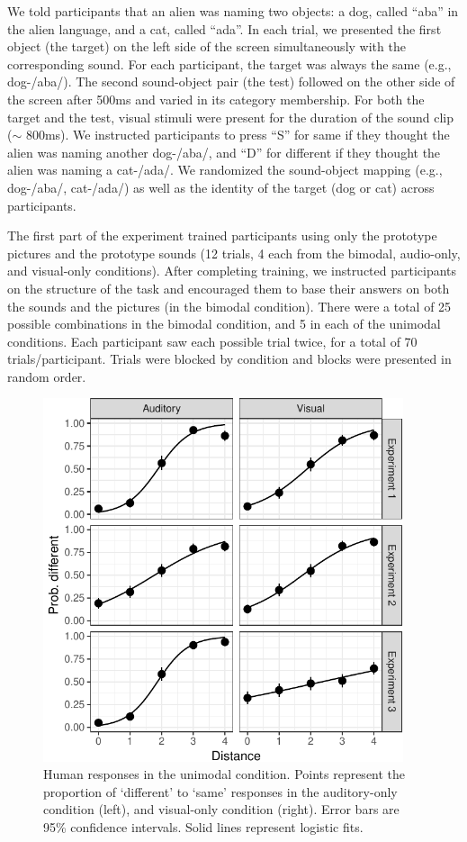 \documentclass[english,man]{apa6}
\theoremstyle{definition}
\theoremstyle{definition}
\theoremstyle{definition}
\theoremstyle{remark}
\begin{document}
We told participants that an alien was naming two objects: a dog, called
\enquote{aba} in the alien language, and a cat, called \enquote{ada}. In
each trial, we presented the first object (the target) on the left side
of the screen simultaneously with the corresponding sound. For each
participant, the target was always the same (e.g., dog-/aba/). The
second sound-object pair (the test) followed on the other side of the
screen after 500ms and varied in its category membership. For both the
target and the test, visual stimuli were present for the duration of the
sound clip (\(\sim\) 800ms). We instructed participants to press
\enquote{S} for same if they thought the alien was naming another
dog-/aba/, and \enquote{D} for different if they thought the alien was
naming a cat-/ada/. We randomized the sound-object mapping (e.g.,
dog-/aba/, cat-/ada/) as well as the identity of the target (dog or cat)
across participants.

The first part of the experiment trained participants using only the
prototype pictures and the prototype sounds (12 trials, 4 each from the
bimodal, audio-only, and visual-only conditions). After completing
training, we instructed participants on the structure of the task and
encouraged them to base their answers on both the sounds and the
pictures (in the bimodal condition). There were a total of 25 possible
combinations in the bimodal condition, and 5 in each of the unimodal
conditions. Each participant saw each possible trial twice, for a total
of 70 trials/participant. Trials were blocked by condition and blocks
were presented in random order.

\begin{figure}

{\centering \includegraphics[width=400px]{ms_files/figure-latex/unimodal-1} 

}

\caption{Human responses in the unimodal condition. Points represent the proportion of `different' to `same' responses in the auditory-only condition (left), and visual-only condition (right). Error bars are 95\% confidence intervals. Solid lines represent logistic fits.}\label{fig:unimodal}
\end{figure}
\end{document}
